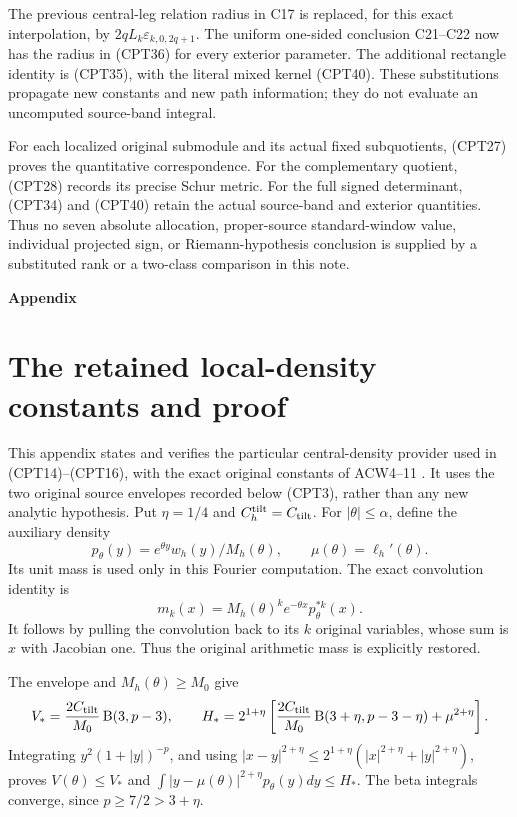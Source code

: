 \documentclass[11pt,a4paper]{article}
\begin{document}
The previous central-leg relation radius in C17 is replaced,
for this exact interpolation, by \(2qL_k\varepsilon_{k,0,2q+1}\).
The uniform one-sided conclusion C21--C22 now has the radius
in (CPT36) for every exterior parameter.
The additional rectangle identity is (CPT35), with the
literal mixed kernel (CPT40).  These substitutions propagate
new constants and new path information; they do not evaluate
an uncomputed source-band integral.

For each localized original submodule and its actual fixed
subquotients, (CPT27) proves the quantitative correspondence.
For the complementary quotient, (CPT28) records its precise
Schur metric.  For the full signed determinant, (CPT34) and
(CPT40) retain the actual source-band and exterior quantities.
Thus no seven absolute allocation, proper-source
standard-window value, individual projected sign, or
Riemann-hypothesis conclusion is supplied by a substituted
rank or a two-class comparison in this note.

\par\bigskip\noindent\textbf{Appendix}\par
\section{The retained local-density constants and proof}

This appendix states and verifies the particular central-density
provider used in (CPT14)--(CPT16), with the exact original constants
of ACW4--11 \cite{cpt:centralProvider}.  It uses the two original
source envelopes recorded below (CPT3), rather than any new
analytic hypothesis.
Put \(\eta=1/4\) and \(C_h^{\rm tilt}=C_{\rm tilt}\).
For \(|\theta|\le\alpha\), define the auxiliary density
\[
 p_\theta(y)=e^{\theta y}w_h(y)/M_h(\theta),\qquad
 \mu(\theta)=\ell_h'(\theta).
\]
Its unit mass is used only in this Fourier computation.  The
exact convolution identity is
\begin{equation}\tag{CPT41}
 m_k(x)=M_h(\theta)^k e^{-\theta x}p_\theta^{*k}(x).
\end{equation}
It follows by pulling the convolution back to its \(k\)
original variables, whose sum is \(x\) with Jacobian one.
Thus the original arithmetic mass is explicitly restored.

The envelope and \(M_h(\theta)\ge M_0\) give
\[
 V_*=\frac{2C_{\rm tilt}}{M_0}\operatorname B(3,p-3),
 \qquad
 H_*=
 2^{1+\eta}\left[
 \frac{2C_{\rm tilt}}{M_0}\operatorname B(3+\eta,p-3-\eta)
                      +\mu^{2+\eta}\right].
\]
Integrating \(y^2(1+|y|)^{-p}\), and using
\(|x-y|^{2+\eta}\le2^{1+\eta}(|x|^{2+\eta}+|y|^{2+\eta})\),
proves \(V(\theta)\le V_*\) and
\(\int|y-\mu(\theta)|^{2+\eta}p_\theta(y)dy\le H_*\).
The beta integrals converge, since \(p\ge7/2>3+\eta\).
\end{document}
